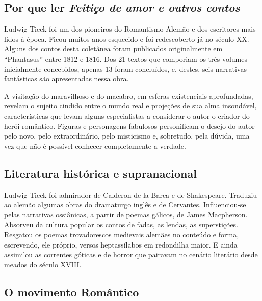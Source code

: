 \documentclass[12pt]{extarticle}
\begin{document}
\subsection{Por que ler \emph{Feitiço de amor e outros contos}}

Ludwig Tieck foi um dos pioneiros do Romantismo Alemão e dos escritores
mais lidos à época. Ficou muitos anos esquecido e foi redescoberto já no
século XX. Alguns dos contos desta coletânea foram publicados
originalmente em ``Phantasus'' entre 1812 e 1816. Dos 21 textos que
comporiam os três volumes inicialmente concebidos, apenas 13 foram
concluídos, e, destes, seis narrativas fantásticas são apresentadas
nessa obra.

A visitação do maravilhoso e do macabro, em esferas existenciais
aprofundadas, revelam o sujeito cindido entre o mundo real e projeções
de sua alma insondável, características que levam alguns especialistas a
considerar o autor o criador do herói romântico. Figuras e personagens
fabulosos personificam o desejo do autor pelo novo, pelo extraordinário,
pelo misticismo e, sobretudo, pela dúvida, uma vez que não é possível
conhecer completamente a verdade.


\subsection{Literatura histórica e supranacional}

Ludwig Tieck foi admirador de Calderon de la Barca e de Shakespeare.
Traduziu ao alemão algumas obras do dramaturgo inglês e de Cervantes.
Influenciou-se pelas narrativas ossiânicas, a partir de poemas gálicos,
de James Macpherson. Absorveu da cultura popular os contos de fadas, as
lendas, as superstições. Resgatou os poemas trovadorescos medievais
alemães no conteúdo e forma, escrevendo, ele próprio, versos
heptassílabos em redondilha maior. E ainda assimilou as correntes
góticas e de horror que pairavam no cenário literário desde meados do
século XVIII.

\subsection{O movimento Romântico}
\end{document}
